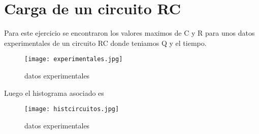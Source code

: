 \documentclass{article}
\begin{document}
\section{Carga de un circuito RC}
Para este ejercicio se encontraron los valores maximos de C y R para unos datos experimentales de un circuito RC donde teniamos Q y el tiempo.
\begin{figure}[h!]
   \centering
    \texttt{[image: experimentales.jpg]}
    \caption{datos experimentales}
    \label{5}
\end{figure}
Luego el histograma asociado es
\begin{figure}[h!]
   \centering
    \texttt{[image: histcircuitos.jpg]}
    \caption{datos experimentales}
    \label{6}
\end{figure}
\end{document}
